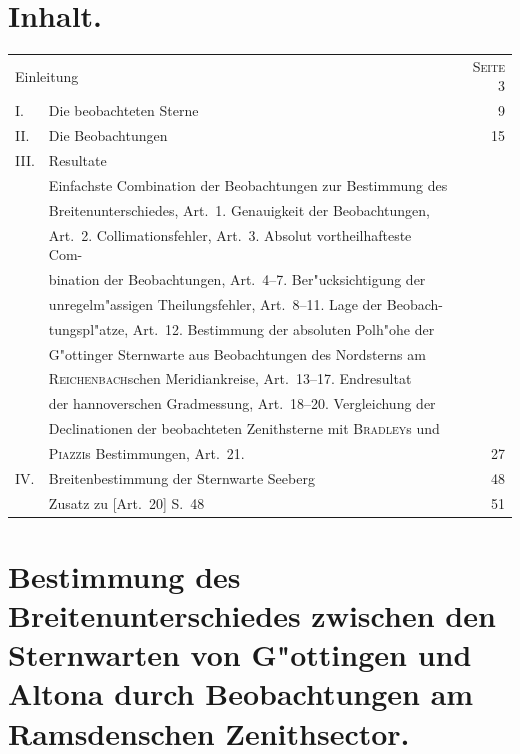 \documentclass[12pt,a4paper]{article}
\theoremstyle{plain}
\theoremstyle{definition}
\theoremstyle{remark}
\begin{document}
\thispagestyle{empty}
\section*{Inhalt.}

\begin{tabular}{@{}ll@{}r@{}}
\toprule
\multicolumn{2}{l}{Einleitung\dotfill} & \textsc{Seite} 3 \\
\addlinespace[0.5em]
\textsc{I.} & Die beobachteten Sterne\dotfill & 9 \\
\addlinespace[0.5em]
\textsc{II.} & Die Beobachtungen\dotfill & 15 \\
\addlinespace[0.5em]
\textsc{III.} & Resultate & \\
\addlinespace[0.3em]
& \quad Einfachste Combination der Beobachtungen zur Bestimmung des & \\
& \quad Breitenunterschiedes, Art.~1. Genauigkeit der Beobachtungen, & \\
& \quad Art.~2. Collimationsfehler, Art.~3. Absolut vortheilhafteste Com- & \\
& \quad bination der Beobachtungen, Art.~4--7. Ber"ucksichtigung der & \\
& \quad unregelm"assigen Theilungsfehler, Art.~8--11. Lage der Beobach- & \\
& \quad tungspl"atze, Art.~12. Bestimmung der absoluten Polh"ohe der & \\
& \quad G"ottinger Sternwarte aus Beobachtungen des Nordsterns am & \\
& \quad \textsc{Reichenbach}schen Meridiankreise, Art.~13--17. Endresultat & \\
& \quad der hannoverschen Gradmessung, Art.~18--20. Vergleichung der & \\
& \quad Declinationen der beobachteten Zenithsterne mit \textsc{Bradley}s und & \\
& \quad \textsc{Piazzi}s Bestimmungen, Art.~21.\dotfill & 27 \\
\addlinespace[0.5em]
\textsc{IV.} & Breitenbestimmung der Sternwarte Seeberg\dotfill & 48 \\
\addlinespace[0.5em]
& Zusatz zu [Art.~20] S.~48\dotfill & 51 \\
\bottomrule
\end{tabular}
\newpage


\setcounter{page}{3}
\section*{Bestimmung des Breitenunterschiedes\newline
zwischen den Sternwarten von G"ottingen und Altona\newline
durch Beobachtungen\newline
am Ramsdenschen Zenithsector.}
\end{document}
